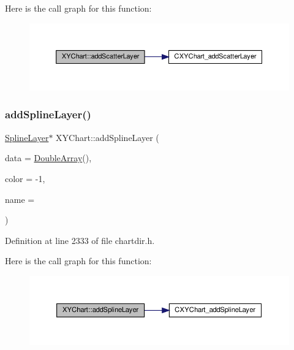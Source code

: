 Here is the call graph for this function\+:
\nopagebreak
\begin{figure}[H]
\begin{center}
\leavevmode
\includegraphics[width=350pt]{class_x_y_chart_ad4f8da077a27f9331cd73009a269555b_cgraph}
\end{center}
\end{figure}
\mbox{\label{class_x_y_chart_ab4d1ef2ffefdf99a52fb8b26b884deab}} 
\subsubsection{\texorpdfstring{add\+Spline\+Layer()}{addSplineLayer()}}
{\footnotesize\ttfamily \hyperlink{class_spline_layer}{Spline\+Layer}$\ast$ X\+Y\+Chart\+::add\+Spline\+Layer (\begin{DoxyParamCaption}\item[{\hyperlink{class_double_array}{Double\+Array}}]{data = {\ttfamily \hyperlink{class_double_array}{Double\+Array}()},  }\item[{int}]{color = {\ttfamily -\/1},  }\item[{const char $\ast$}]{name = {} }\end{DoxyParamCaption})\hspace{0.3cm}{\ttfamily [inline]}}



Definition at line 2333 of file chartdir.\+h.

Here is the call graph for this function\+:
\nopagebreak
\begin{figure}[H]
\begin{center}
\leavevmode
\includegraphics[width=350pt]{class_x_y_chart_ab4d1ef2ffefdf99a52fb8b26b884deab_cgraph}
\end{center}
\end{figure}
\mbox{\label{class_x_y_chart_a6e09d8cb36b0c8299c44836f687595b1}} 
